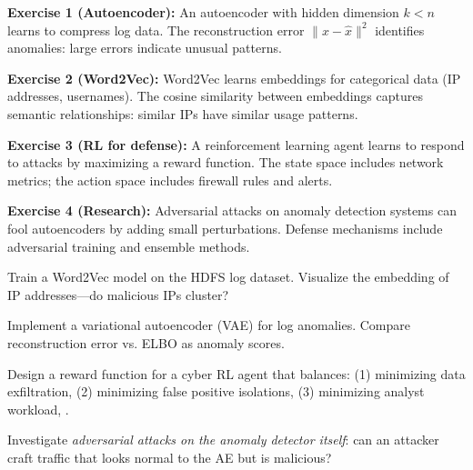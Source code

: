 \begin{solution}
\textbf{Exercise 1 (Autoencoder):} An autoencoder with hidden dimension $k < n$ learns to compress log data. The reconstruction error $\|x - \hat{x}\|^2$ identifies anomalies: large errors indicate unusual patterns.
\end{solution}

\begin{solution}
\textbf{Exercise 2 (Word2Vec):} Word2Vec learns embeddings for categorical data (IP addresses, usernames). The cosine similarity between embeddings captures semantic relationships: similar IPs have similar usage patterns.
\end{solution}

\begin{solution}
\textbf{Exercise 3 (RL for defense):} A reinforcement learning agent learns to respond to attacks by maximizing a reward function. The state space includes network metrics; the action space includes firewall rules and alerts.
\end{solution}

\begin{solution}
\textbf{Exercise 4 (Research):} Adversarial attacks on anomaly detection systems can fool autoencoders by adding small perturbations. Defense mechanisms include adversarial training and ensemble methods.
\end{solution}

\label{sec:cyber:exercises} \cite{emanuello2022cyber}

\begin{exercise}
Train a Word2Vec model on the HDFS log dataset. Visualize the embedding of IP addresses---do malicious IPs cluster?
\end{exercise}

\begin{exercise}
Implement a variational autoencoder (VAE) for log anomalies. Compare reconstruction error vs. ELBO as anomaly scores.
\end{exercise}

\begin{exercise}
Design a reward function for a cyber RL agent that balances: (1) minimizing data exfiltration, (2) minimizing false positive isolations, (3) minimizing analyst workload, \cite{emanuello2022cyber}.
\end{exercise}

\begin{exercise}[Research]
Investigate \emph{adversarial attacks on the anomaly detector itself}: can an attacker craft traffic that looks normal to the AE but is malicious? \cite{emanuello2022cyber}
\end{exercise}